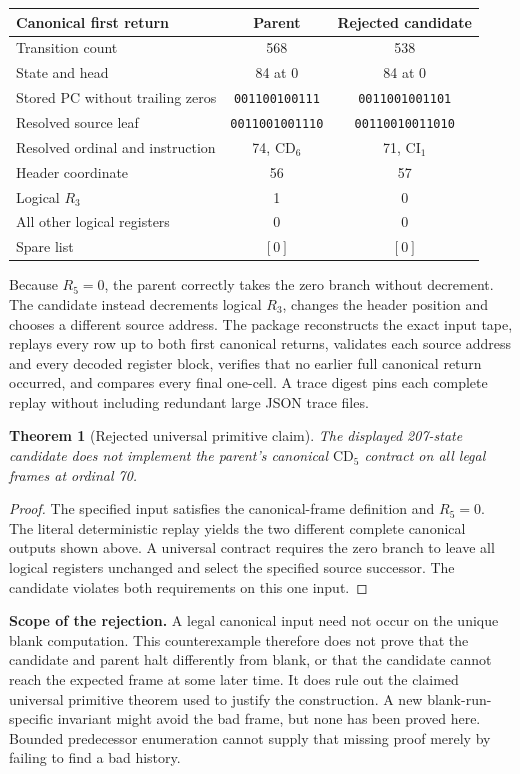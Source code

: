 \documentclass[11pt,letterpaper]{article}
\newtheorem{theorem}{Theorem}[section]\newtheorem{lemma}[theorem]{Lemma}
\begin{document}
\begin{center}\small
\begin{tabular}{lcc}\toprule
Canonical first return & Parent & Rejected candidate\\\midrule
Transition count & 568 & 538\\
State and head & 84 at 0 & 84 at 0\\
Stored PC without trailing zeros & \texttt{001100100111} & \texttt{0011001001101}\\
Resolved source leaf & \texttt{0011001001110} & \texttt{00110010011010}\\
Resolved ordinal and instruction & 74, $\mathrm{CD}_6$ & 71, $\mathrm{CI}_1$\\
Header coordinate & 56 & 57\\
Logical $R_3$ & 1 & 0\\
All other logical registers & 0 & 0\\
Spare list & $[0]$ & $[0]$\\\bottomrule
\end{tabular}
\end{center}

Because $R_5=0$, the parent correctly takes the zero branch without decrement.
The candidate instead decrements logical $R_3$, changes the header position
and chooses a different source address. The package reconstructs the exact
input tape, replays every row up to both first canonical returns, validates each source
address and every decoded register block, verifies that no earlier full
canonical return occurred, and compares every final one-cell.
A trace digest pins each complete replay without including redundant large
JSON trace files.

\begin{theorem}[Rejected universal primitive claim]
The displayed 207-state candidate does not implement the parent's canonical
$\mathrm{CD}_5$ contract on all legal frames at ordinal 70.
\end{theorem}
\begin{proof}
The specified input satisfies the canonical-frame definition and $R_5=0$.
The literal deterministic replay yields the two different complete canonical
outputs shown above. A universal contract requires the zero branch to leave
all logical registers unchanged and select the specified source successor.
The candidate violates both requirements on this one input.
\end{proof}

\textbf{Scope of the rejection.} A legal canonical input need not occur on the
unique blank computation. This counterexample therefore does not prove that
the candidate and parent halt differently from blank, or that the candidate
cannot reach the expected frame at some later time. It does rule out the
claimed universal primitive theorem used to justify the construction. A new
blank-run-specific invariant might avoid the bad frame, but none has been
proved here. Bounded predecessor enumeration cannot supply that missing proof
merely by failing to find a bad history.
\end{document}

